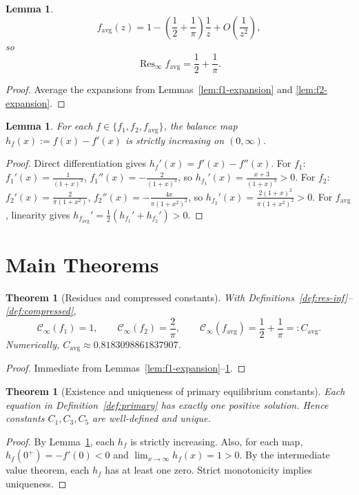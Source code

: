\documentclass[11pt]{article}
\theoremstyle{definition}
\theoremstyle{plain}
\newtheorem{lemma}[definition]{Lemma}
\newtheorem{theorem}[definition]{Theorem}
\begin{document}
\begin{lemma}
\label{lem:avg-expansion}
\[
f_{\mathrm{avg}}(z)=1-\left(\frac12+\frac1\pi\right)\frac{1}{z}+O\!\left(\frac{1}{z^2}\right),
\]
so
\[
\operatorname{Res}_{\infty}f_{\mathrm{avg}}=\frac12+\frac1\pi.
\]
\end{lemma}
\begin{proof}
Average the expansions from Lemmas~\ref{lem:f1-expansion} and \ref{lem:f2-expansion}.
\end{proof}

\begin{lemma}
\label{lem:monotone-balance}
For each \(f\in\{f_1,f_2,f_{\mathrm{avg}}\}\), the balance map
\(h_f(x):=f(x)-f'(x)\) is strictly increasing on \((0,\infty)\).
\end{lemma}
\begin{proof}
Direct differentiation gives
\(h_f'(x)=f'(x)-f''(x)\).
For \(f_1\): \(f_1'(x)=\frac{1}{(1+x)^2}\), \(f_1''(x)=-\frac{2}{(1+x)^3}\), so
\(h_{f_1}'(x)=\frac{x+3}{(1+x)^3}>0\).
For \(f_2\): \(f_2'(x)=\frac{2}{\pi(1+x^2)}\), \(f_2''(x)=-\frac{4x}{\pi(1+x^2)^2}\), so
\(h_{f_2}'(x)=\frac{2(1+x)^2}{\pi(1+x^2)^2}>0\).
For \(f_{\mathrm{avg}}\), linearity gives
\(h_{f_{\mathrm{avg}}}'=\frac{1}{2}(h_{f_1}'+h_{f_2}')>0\).
\end{proof}

\section{Main Theorems}
\begin{theorem}[Residues and compressed constants]
\label{thm:residues}
With Definitions~\ref{def:res-inf}--\ref{def:compressed},
\[
\mathcal C_{\infty}(f_1)=1,
\qquad
\mathcal C_{\infty}(f_2)=\frac{2}{\pi},
\qquad
\mathcal C_{\infty}(f_{\mathrm{avg}})=\frac12+\frac1\pi=:C_{\mathrm{avg}}.
\]
Numerically, \(C_{\mathrm{avg}}\approx 0.8183098861837907\).
\end{theorem}
\begin{proof}
Immediate from Lemmas~\ref{lem:f1-expansion}--\ref{lem:avg-expansion}.
\end{proof}

\begin{theorem}[Existence and uniqueness of primary equilibrium constants]
\label{thm:primary}
Each equation in Definition~\ref{def:primary} has exactly one positive solution.
Hence constants \(C_1,C_3,C_5\) are well-defined and unique.
\end{theorem}
\begin{proof}
By Lemma~\ref{lem:monotone-balance}, each \(h_f\) is strictly increasing.
Also, for each map, \(h_f(0^+)=-f'(0)<0\) and \(\lim_{x\to\infty}h_f(x)=1>0\).
By the intermediate value theorem, each \(h_f\) has at least one zero.
Strict monotonicity implies uniqueness.
\end{proof}
\end{document}
